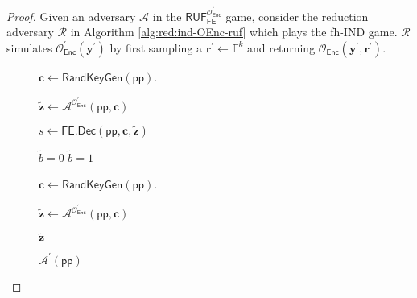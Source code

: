 \begin{proof}

Given an adversary $\mathcal{A}$ in the $\textsf{RUF}^{\mathcal{O}^\prime_{\textsf{Enc}}}_{\textsf{FE}}$ game, consider the reduction adversary $\mathcal{R}$ in Algorithm \ref{alg:red:ind-OEnc-ruf} which plays the \textsf{fh-IND} game. $\mathcal{R}$ simulates $\mathcal{O}_\textsf{Enc}^\prime(\mathbf{y}^\prime)$ by first sampling a $\mathbf{r}^\prime \gets \mathbb{F}^k$ and returning $\mathcal{O}_\textsf{Enc}(\mathbf{y}^\prime, \mathbf{r}^\prime)$.

\begin{figure}[h]
\centering

	\begin{minipage}{0.4\linewidth}
	\centering
	\begin{algorithm}[H]
	\caption{$\mathcal{R}^{\mathcal{O}_{\textsf{KeyGen}}, \mathcal{O}_{\textsf{Enc}}}(\textsf{pp})$}
	\label{alg:red:ind-OEnc-ruf}
	\begin{algorithmic}[1]
		\State $\mathbf{c} \gets \textsf{RandKeyGen}(\textsf{pp})$. 

		\State ${\mathbf{\tilde{z}}} \gets {\mathcal{A}}^{\mathcal{O}^\prime_{\textsf{Enc}}} (\textsf{pp}, \mathbf{c})$

		\State $s \gets \textsf{FE.Dec}( \textsf{pp}, \mathbf{c}, \mathbf{\tilde{z}} )$
		
			\State \Return $\tilde{b} = 0$
		\Else
			\State \Return $\tilde{b} = 1$
		\EndIf

	\end{algorithmic}
	\end{algorithm}
	\end{minipage}
	\hspace{0.05\textwidth}
	\begin{minipage}{0.4\linewidth}
	\centering
	\begin{algorithm}[H]
	\caption{$\mathcal{A}^\prime (\textsf{pp})$}
	\label{alg:adv:ind-OEnc-ruf}
	\begin{algorithmic}[1]
		\State $\mathbf{c} \gets \textsf{RandKeyGen}(\textsf{pp})$. 

		\State ${\mathbf{\tilde{z}}} \gets {\mathcal{A}}^{\mathcal{O}^\prime_{\textsf{Enc}}} (\textsf{pp}, \mathbf{c})$

		\State \Return $\mathbf{\tilde{z}}$
	\end{algorithmic}
	\end{algorithm}
	\end{minipage}
	

\end{figure}
\end{proof}
